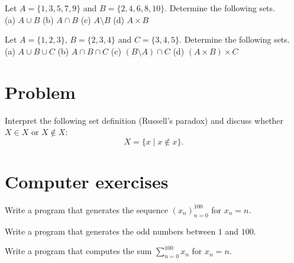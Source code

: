 \documentclass{tstextbook}
\begin{document}
\begin{exercise}
  Let $A = \{1, 3, 5, 7, 9\}$ and $B = \{2, 4, 6, 8, 10\}$.
  Determine the following sets. \\
  (a) $A \cup B$ \quad
  (b) $A \cap B$ \quad
  (c) $A \setminus B$ \quad
  (d) $A \times B$
\end{exercise}

\begin{exercise}
  Let $A = \{1, 2, 3\}$, $B = \{2, 3, 4\}$ and $C = \{3, 4, 5\}$.
  Determine the following sets. \\
  (a) $A \cup B \cup C$ \quad
  (b) $A \cap B \cap C$ \quad
  (c) $(B \setminus A) \cap C$ \quad
  (d) $(A \times B) \times C$
\end{exercise}

\section*{Problem}

\begin{problem}
  Interpret the following set definition (Russell's paradox) and discuss
  whether $X \in X$ or $X \notin X$:
  \begin{equation}
    X = \{x \mid x \notin x\}.
  \end{equation}
\end{problem}

\section*{Computer exercises}

\begin{programming}
  Write a program that generates the sequence $(x_n)_{n=0}^{100}$
  for $x_n = n$.
\end{programming}

\begin{programming}
  Write a program that generates the odd numbers between $1$ and $100$.
\end{programming}

\begin{programming}
  Write a program that computes the sum $\sum_{n=0}^{100} x_n$
  for $x_n = n$.
\end{programming}
\end{document}
